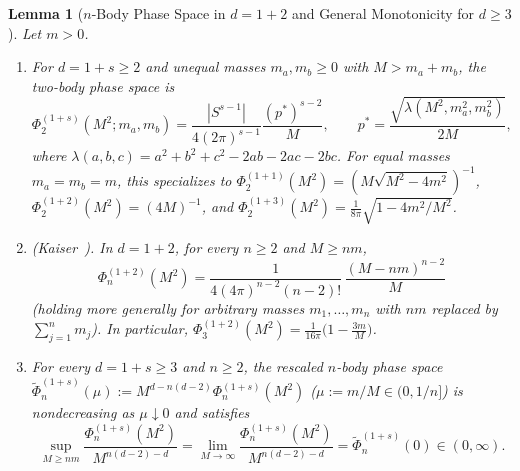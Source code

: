\documentclass[11pt,a4paper]{article}
\newtheorem{lemma}[theorem]{Lemma}
\theoremstyle{definition}
\theoremstyle{remark}
\begin{document}
\begin{lemma}[$n$-Body Phase Space in $d=1+2$ and General Monotonicity for $d\ge 3$]\label{lem:phase-space}
Let $m>0$.
\begin{enumerate}[label=\textup{(\roman*)},leftmargin=*]
\item For $d=1+s\ge 2$ and unequal masses $m_a,m_b\ge 0$ with $M>m_a+m_b$, the two-body phase space is
\begin{equation}\label{eq:phi2-gen}
\Phi_2^{(1+s)}(M^2;m_a,m_b) = \frac{|S^{s-1}|}{4(2\pi)^{s-1}}\frac{(p^*)^{s-2}}{M},
\qquad p^* = \frac{\sqrt{\lambda(M^2,m_a^2,m_b^2)}}{2M},
\end{equation}
where $\lambda(a,b,c)=a^2+b^2+c^2-2ab-2ac-2bc$. For equal masses $m_a=m_b=m$, this specializes to $\Phi_2^{(1+1)}(M^2)=(M\sqrt{M^2-4m^2})^{-1}$, $\Phi_2^{(1+2)}(M^2)=(4M)^{-1}$, and $\Phi_2^{(1+3)}(M^2)=\frac{1}{8\pi}\sqrt{1-4m^2/M^2}$.
\item \emph{(Kaiser~\cite[Sec.~2, Eqs.~(2), (5)--(10)]{Kaiser2025}).} In $d=1+2$, for every $n\ge 2$ and $M\ge nm$,
\begin{equation}\label{eq:phin-2p1}
\Phi_n^{(1+2)}(M^2) = \frac{1}{4(4\pi)^{n-2}(n-2)!}\,\frac{(M-nm)^{n-2}}{M}
\end{equation}
(holding more generally for arbitrary masses $m_1,\dots,m_n$ with $nm$ replaced by $\sum_{j=1}^n m_j$). In particular, $\Phi_3^{(1+2)}(M^2) = \frac{1}{16\pi}\bigl(1 - \frac{3m}{M}\bigr)$.
\item For every $d=1+s\ge 3$ and $n\ge 2$, the rescaled $n$-body phase space $\widetilde{\Phi}_n^{(1+s)}(\mu) := M^{d-n(d-2)}\Phi_n^{(1+s)}(M^2)$ ($\mu := m/M\in(0,1/n]$) is nondecreasing as $\mu\downarrow 0$ and satisfies
\begin{equation}\label{eq:phin-asymp}
\sup_{M\ge nm} \frac{\Phi_n^{(1+s)}(M^2)}{M^{n(d-2)-d}}
= \lim_{M\to\infty}\frac{\Phi_n^{(1+s)}(M^2)}{M^{n(d-2)-d}}
= \widetilde{\Phi}_n^{(1+s)}(0) \in (0,\infty).
\end{equation}
\end{enumerate}
\end{lemma}
\end{document}
